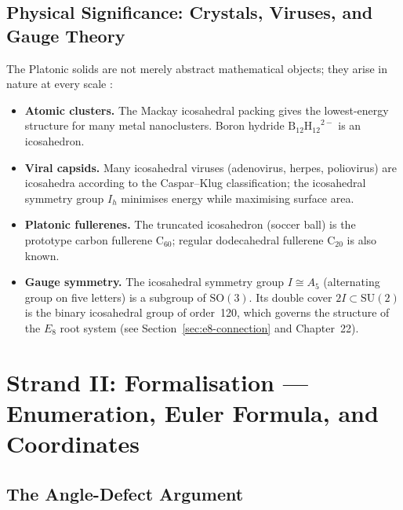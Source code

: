 \subsection{Physical Significance: Crystals, Viruses, and Gauge Theory}
\label{subsec:physical-significance}

The Platonic solids are not merely abstract mathematical objects; they arise in
nature at every scale \cite{atiyah_sutcliffe_polyhedra}:
\begin{itemize}
  \item \textbf{Atomic clusters.} The Mackay icosahedral packing gives the
        lowest-energy structure for many metal nanoclusters.  Boron hydride
        $\mathrm{B_{12}H_{12}}^{2-}$ is an icosahedron.
  \item \textbf{Viral capsids.} Many icosahedral viruses (adenovirus, herpes,
        poliovirus) are icosahedra according to the Caspar–Klug classification;
        the icosahedral symmetry group $I_h$ minimises energy while maximising
        surface area.
  \item \textbf{Platonic fullerenes.} The truncated icosahedron (soccer ball)
        is the prototype carbon fullerene $\mathrm{C_{60}}$; regular
        dodecahedral fullerene $\mathrm{C_{20}}$ is also known.
  \item \textbf{Gauge symmetry.} The icosahedral symmetry group $I \cong A_5$
        (alternating group on five letters) is a subgroup of $\mathrm{SO}(3)$.
        Its double cover $2I \subset \mathrm{SU}(2)$ is the binary icosahedral
        group of order~120, which governs the structure of the $E_8$ root
        system (see Section~\ref{sec:e8-connection} and Chapter~22).
\end{itemize}


\section{Strand II: Formalisation — Enumeration, Euler Formula, and Coordinates}
\label{sec:platonic-formalisation}

\subsection{The Angle-Defect Argument}
\label{sec:angle-defect}

